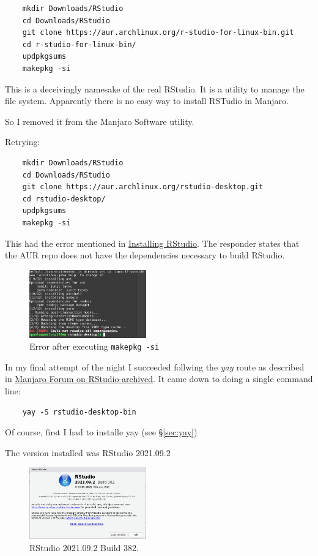 \documentclass[]{scrartcl}
\begin{document}
\begin{verbatim}
	mkdir Downloads/RStudio
	cd Downloads/RStudio
	git clone https://aur.archlinux.org/r-studio-for-linux-bin.git
	cd r-studio-for-linux-bin/
	updpkgsums
	makepkg -si	
\end{verbatim}

This is a deceivingly namesake of the real RStudio. It is a utility to manage the file system.
Apparently there is no easy way to install RSTudio in Manjaro.

So I removed it from the Manjaro Software utility.

Retrying:

\begin{verbatim}
	mkdir Downloads/RStudio
	cd Downloads/RStudio
	git clone https://aur.archlinux.org/rstudio-desktop.git
	cd rstudio-desktop/
	updpkgsums
	makepkg -si	
\end{verbatim}

This had the error mentioned in \href{https://forum.manjaro.org/t/rstudio-on-pinebook-pro-aarch64/60827/6?u=padames}{Installing RStudio}. The responder states that the AUR repo does not have the dependencies necessary to build RStudio.

\begin{figure}[!htb]
	\centering
	\caption{Error after executing \texttt{makepkg -si}}
	\includegraphics[width=0.45\textwidth]{Images/ErrorInstallingAUR.png}
\end{figure}

In my final attempt of the night I succeeded follwing the \textit{yay} route as described in \href{https://archived.forum.manjaro.org/t/using-the-statistical-package-r-in-manjaro-with-rstudio/484}{Manjaro Forum on RStudio-archived}. 
It came down to doing a single command line:
\begin{verbatim}
	yay -S rstudio-desktop-bin
\end{verbatim}
Of course, first I had to installe yay (see \S\ref{sec:yay})

The version installed was RStudio 2021.09.2

\begin{figure}[!htb]
	\centering
	\caption{RStudio 2021.09.2 Build 382.}
	\includegraphics[width=0.45\textwidth]{Images/RStudioSplashWindowFeb07-2022.png}
\end{figure}
\end{document}
